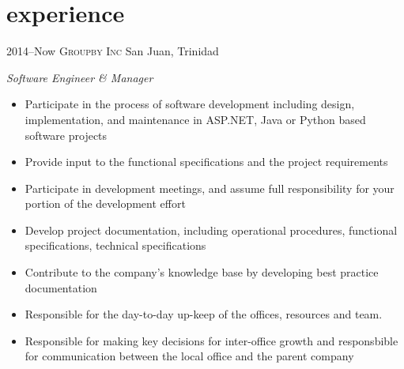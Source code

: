 \documentclass[]{friggeri-cv} %
\begin{document}

\section{experience}

\begin{entrylist}
\entry
{2014--Now}
{\textsc{Groupby Inc}}
{San Juan, Trinidad}
{\emph{Software Engineer \& Manager} \\
\begin{itemize}
\item Participate in the process of software development including design, implementation, and maintenance in ASP.NET, Java or Python based software projects
\item Provide input to the functional specifications and the project requirements
\item Participate in development meetings, and assume full responsibility for your portion of the development effort
\item Develop project documentation, including operational procedures, functional specifications, technical specifications
\item Contribute to the company's knowledge base by developing best practice documentation
\item Responsible for the day-to-day up-keep of the offices, resources and team.
\item Responsible for making key decisions for inter-office growth and responsbible for communication between the local office and the parent company
\end{itemize}}
\end{entrylist}
\end{document}
